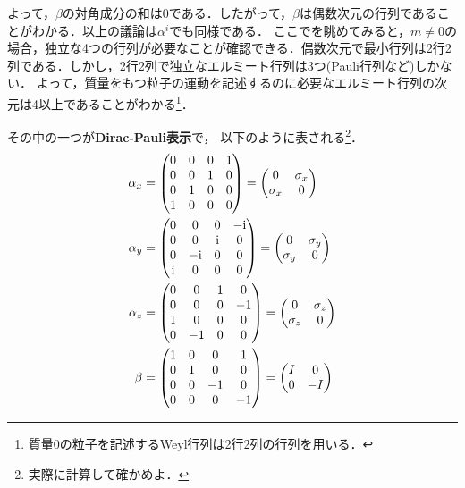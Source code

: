 \documentclass{report}
\begin{document}
よって，$\beta$の対角成分の和は0である．したがって，$\beta$は偶数次元の行列であることがわかる．以上の議論は$\alpha^i$でも同様である．
ここでを眺めてみると，$m\neq0$の場合，独立な4つの行列が必要なことが確認できる．偶数次元で最小行列は2行2列である．しかし，2行2列で独立なエルミート行列は3つ(Pauli行列など)しかない．
よって，質量をもつ粒子の運動を記述するのに必要なエルミート行列の次元は4以上であることがわかる\footnote{質量0の粒子を記述するWeyl行列は2行2列の行列を用いる．}．

その中の一つが\textbf{Dirac-Pauli表示}で，
以下のように表される\footnote{実際に計算して確かめよ．}．
\begin{align}
  \alpha_x &= 
  \begin{pmatrix}
    0 & 0 & 0 & 1\\
    0 & 0 & 1 & 0\\
    0 & 1 & 0 & 0\\
    1 & 0 & 0 & 0\\
  \end{pmatrix}
  =
  \begin{pmatrix}
    0 & \sigma_x\\
    \sigma_x & 0
  \end{pmatrix}\\
  \alpha_y &= 
  \begin{pmatrix}
    0 & 0 & 0 & -\mathrm{i}\\
    0 & 0 & \mathrm{i} & 0\\
    0 & -\mathrm{i} & 0 & 0\\
    \mathrm{i} & 0 & 0 & 0\\
  \end{pmatrix}
  =
  \begin{pmatrix}
    0 & \sigma_y\\
    \sigma_y & 0
  \end{pmatrix}\\
  \alpha_z &= 
  \begin{pmatrix}
    0 & 0 & 1 & 0\\
    0 & 0 & 0 & -1\\
    1 & 0 & 0 & 0\\
    0 & -1 & 0 & 0\\
  \end{pmatrix}
  =
  \begin{pmatrix}
    0 & \sigma_z\\
    \sigma_z & 0
  \end{pmatrix}\\
  \beta &= 
  \begin{pmatrix}
    1 & 0 & 0 & 1\\
    0 & 1 & 0 & 0\\
    0 & 0 & -1 & 0\\
    0 & 0 & 0 & -1\\
  \end{pmatrix}
  =
  \begin{pmatrix}
    I & 0\\
    0 & -I
  \end{pmatrix}
\end{align}
\end{document}
